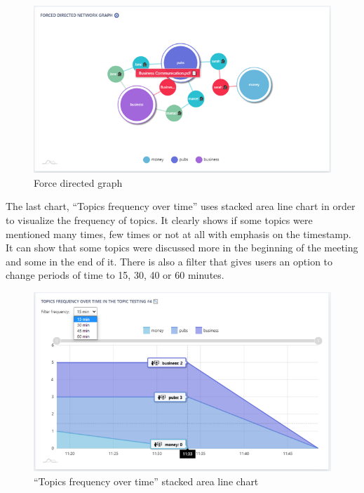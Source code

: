 \documentclass{article}
\begin{document}
\begin{figure}[H]
  \centering
  \includegraphics[scale=0.82]{charts/topics5.png}
  \caption{Force directed graph}
  \label{fig:topics5}
\end{figure}

{\large
The last chart, ``Topics frequency over time'' uses stacked area line chart in order to visualize the frequency of topics. It clearly shows if some topics were mentioned many times, few times or not at all with emphasis on the timestamp. It can show that some topics were discussed more in the beginning of the meeting and some in the end of it. There is also a filter that gives users an option to change periods of time to 15, 30, 40 or 60 minutes.\par 
}

\begin{figure}[H]
  \centering
  \includegraphics[scale=0.82]{charts/topics6.png}
  \caption{``Topics frequency over time'' stacked area line chart}
  \label{fig:topics6}
\end{figure}
\end{document}
